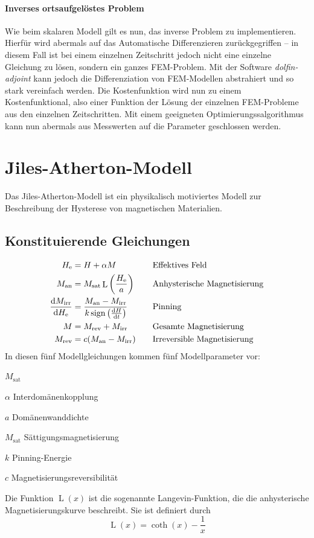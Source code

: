 \documentclass{scrartcl}
\DeclareMathOperator{\sign}{sign}
\DeclareMathOperator{\Langevin}{L}
\newcommand{\He}{H_\text{e}}
\newcommand{\Man}{M_\text{an}}
\newcommand{\Msat}{M_\text{sat}}
\newcommand{\Mirr}{M_\text{irr}}
\newcommand{\Mrev}{M_\text{rev}}
\begin{document}
\paragraph{Inverses ortsaufgelöstes Problem}
Wie beim skalaren Modell gilt es nun, das inverse Problem zu implementieren. Hierfür wird abermals auf das Automatische Differenzieren zurückgegriffen -- in diesem Fall ist bei einem einzelnen Zeitschritt jedoch nicht eine einzelne Gleichung zu lösen, sondern ein ganzes FEM-Problem. Mit der Software \emph{dolfin-adjoint} kann jedoch die Differenziation von FEM-Modellen abstrahiert und so stark vereinfach werden. Die Kostenfunktion wird nun zu einem Kostenfunktional, also einer Funktion der Lösung der einzelnen FEM-Probleme aus den einzelnen Zeitschritten. Mit einem geeigneten Optimierungssalgorithmus kann nun abermals aus Messwerten auf die Parameter geschlossen werden.
\section{Jiles-Atherton-Modell}
\label{sec:jiles-atherton}
Das Jiles-Atherton-Modell ist ein physikalisch motiviertes Modell zur Beschreibung der Hysterese von magnetischen Materialien.
\subsection{Konstituierende Gleichungen}
\begin{align}
	\He &= H + \alpha M \quad &&\text{Effektives Feld} \label{eq:h_eff}\\
	\Man &= \Msat \Langevin\left(\frac{\He}{a}\right) \quad &&\text{Anhysterische Magnetisierung}  \label{eq:m_an}\\
	\frac{\dif\Mirr}{\dif \He} &= \frac{\Man - \Mirr}{k \sign\left(\frac{\dif H}{\dif t}\right)} \quad &&\text{Pinning} \label{eq:pinning}\\
	M &= \Mrev + \Mirr \quad &&\text{Gesamte Magnetisierung} \label{eq:m_gesamt}\\
	\Mrev &= c(\Man - \Mirr) \quad &&\text{Irreversible Magnetisierung} \label{eq:m_rev}
\end{align}
In diesen fünf Modellgleichungen kommen fünf Modellparameter vor:
\begin{labeling}{$\Msat$}
	\item[$\alpha$]{Interdomänenkopplung}
	\item[$a$]{Domänenwanddichte}
	\item[$\Msat$]{Sättigungsmagnetisierung}
	\item[$k$]{Pinning-Energie}
	\item[$c$]{Magnetisierungsreversibilität}
\end{labeling}
Die Funktion $\Langevin(x)$ ist die sogenannte Langevin-Funktion, die die anhysterische Magnetisierungskurve beschreibt. Sie ist definiert durch
\begin{equation}
	\Langevin(x) = \coth(x) - \frac{1}{x}
\end{equation}
\end{document}
